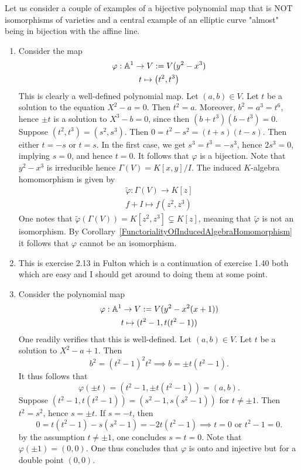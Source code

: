 \begin{example}
    Let us consider a couple of examples of a bijective polynomial map that is NOT isomorphisms of varieties and a central example of an elliptic curve "almost" being in bijection with the affine line. 
    \begin{enumerate}
        \item Consider the map 
        \begin{gather*}
            \varphi : \mathbb{A}^1 \rightarrow V:= V(y^2-x^3)\\
            t \mapsto \left(t^2,t^3\right)
        \end{gather*}
        This is clearly a well-defined polynomial map. Let $(a,b)\in V$. Let $t$ be a solution to the equation $X^2-a=0$. Then $t^2 = a$. Moreover, $b^2 = a^3 = t^6$, hence $\pm t$ is a solution to $X^3-b=0$, since then $(b+t^3)(b-t^3)=0$. Suppose $\left(t^2,t^3\right)=\left(s^2,s^3\right)$. Then $0=t^2-s^2=(t+s)(t-s)$. Then either $t=-s$ or $t=s$. In the first case, we get $s^3 = t^3 = -s^3$, hence $2s^3 =0$, implying $s=0$, and hence $t=0$. It follows that $\varphi$ is a bijection. Note that $y^2-x^3$ is irreducible hence $\Gamma(V)=K[x,y]/I$. The induced $K$-algebra homomorphism is given by 
        \begin{gather*}
            \widetilde{\varphi}: \Gamma(V) \rightarrow K[z]\\
            f + I \mapsto f(z^2,z^3)            
        \end{gather*}
        One notes that $\widetilde{\varphi}(\Gamma(V))= K[z^2,z^3]\subsetneq K[z]$, meaning that $\widetilde{\varphi}$ is not an isomorphism. By Corollary~\ref{FunctorialityOfInducedAlgebraHomomorphism} it follows that $\varphi$ cannot be an isomorphism. 
        \item 
        {\Large This is exercise 2.13 in Fulton which is a continuation of exercise 1.40 both which are easy and I should get around to doing them at some point.}
        \item Consider the polynomial map 
        \begin{gather*}
            \varphi: \mathbb{A}^1 \rightarrow V:= V(y^2-x^2(x+1))\\
            t \mapsto (t^2-1,t(t^2-1))
        \end{gather*}
        One readily verifies that this is well-defined. Let $(a,b)\in V$. Let $t$ be a solution to $X^2-a+1$. Then 
        $$b^2 = (t^2-1)^2t^2 \implies b = \pm t(t^2-1).$$
        It thus follows that 
        $$\varphi(\pm t) = (t^2-1,\pm t(t^2-1))= (a,b).$$
        Suppose $(t^2-1,t(t^2-1))=(s^2-1,s(s^2-1))$ for $t\neq \pm 1$. Then $t^2=s^2$, hence $s=\pm t$. If $s=-t$, then 
        $$0 = t(t^2-1)-s(s^2-1)= -2t(t^2-1) \implies t=0 \text{ or } t^2-1 =0.$$
        by the assumption $t\neq \pm 1$, one concludes $s=t = 0$. Note that $\varphi(\pm 1)= (0,0)$. One thus concludes that $\varphi$ is onto and injective but for a double point $(0,0)$.
    \end{enumerate}
\end{example}
